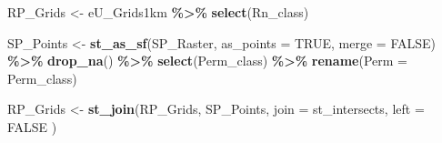 \documentclass[
  12pt,
]{article}
\newenvironment{Shaded}{\begin{snugshade}}{\end{snugshade}}
\newcommand{\DataTypeTok}[1]{\textcolor[rgb]{0.13,0.29,0.53}{#1}}
\newcommand{\KeywordTok}[1]{\textcolor[rgb]{0.13,0.29,0.53}{\textbf{#1}}}
\newcommand{\NormalTok}[1]{#1}
\newcommand{\OperatorTok}[1]{\textcolor[rgb]{0.81,0.36,0.00}{\textbf{#1}}}
\newcommand{\OtherTok}[1]{\textcolor[rgb]{0.56,0.35,0.01}{#1}}
\newcommand{\StringTok}[1]{\textcolor[rgb]{0.31,0.60,0.02}{#1}}
\begin{document}
\begin{Shaded}
\begin{Highlighting}[]
\NormalTok{  RP\_Grids \textless{}{-}}\StringTok{ }\NormalTok{eU\_Grids1km }\OperatorTok{\%\textgreater{}\%}
\StringTok{    }\KeywordTok{select}\NormalTok{(Rn\_class)}
  
\NormalTok{  SP\_Points \textless{}{-}}\StringTok{ }\KeywordTok{st\_as\_sf}\NormalTok{(SP\_Raster, }\DataTypeTok{as\_points =} \OtherTok{TRUE}\NormalTok{, }\DataTypeTok{merge =} \OtherTok{FALSE}\NormalTok{) }\OperatorTok{\%\textgreater{}\%}
\StringTok{    }\KeywordTok{drop\_na}\NormalTok{() }\OperatorTok{\%\textgreater{}\%}
\StringTok{    }\KeywordTok{select}\NormalTok{(Perm\_class) }\OperatorTok{\%\textgreater{}\%}
\StringTok{    }\KeywordTok{rename}\NormalTok{(}\DataTypeTok{Perm =}\NormalTok{ Perm\_class)}
  
\NormalTok{  RP\_Grids \textless{}{-}}\StringTok{ }\KeywordTok{st\_join}\NormalTok{(RP\_Grids, SP\_Points,}
                      \DataTypeTok{join =}\NormalTok{ st\_intersects,}
                      \DataTypeTok{left =} \OtherTok{FALSE}
\NormalTok{  )}


\end{Highlighting}
\end{Shaded}
\end{document}
